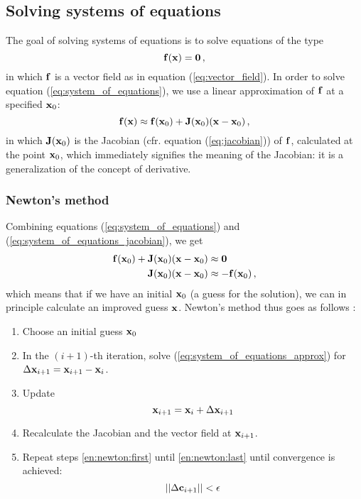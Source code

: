 \subsection{Solving systems of equations}
    The goal of solving systems of equations is to solve equations of the type
    \begin{equation} \label{eq:system_of_equations}
        \vb{f}(\vb{x}) = \vb{0} \thinspace ,
    \end{equation}
    in which $\vb{f}$ is a vector field as in equation (\ref{eq:vector_field}). In order to solve equation (\ref{eq:system_of_equations}), we use a linear approximation of $\vb{f}$ at a specified $\vb{x}_0$:
    \begin{equation} \label{eq:system_of_equations_jacobian}
        \vb{f}(\vb{x}) \approx \vb{f}(\vb{x}_0) + \vb{J}(\vb{x}_0) (\vb{x} - \vb{x}_0) \thinspace ,
    \end{equation}
    in which $\vb{J}(\vb{x}_0)$ is the Jacobian (cfr. equation (\ref{eq:jacobian})) of $\vb{f}$, calculated at the point $\vb{x}_0$, which immediately signifies the meaning of the Jacobian: it is a generalization of the concept of derivative.

\subsubsection{Newton's method}
    Combining equations (\ref{eq:system_of_equations}) and (\ref{eq:system_of_equations_jacobian}), we get
    \begin{align}
        \vb{f}(\vb{x}_0) + \vb{J}(\vb{x}_0) (\vb{x} - \vb{x}_0) &\approx \vb{0} \\
        \vb{J}(\vb{x}_0) (\vb{x} - \vb{x}_0) & \approx - \vb{f}(\vb{x}_0) \label{eq:system_of_equations_approx} \thinspace ,
    \end{align}
    which means that if we have an initial $\vb{x}_0$ (a guess for the solution), we can in principle calculate an improved guess $\vb{x}$. Newton's method thus goes as follows \cite{burden2010}:
    \begin{enumerate}
        \item Choose an initial guess $\vb{x}_0$
        \item \label{en:newton:first} In the $(i+1)$-th iteration, solve (\ref{eq:system_of_equations_approx}) for $\Delta \vb{x}_{i+1} = \vb{x}_{i+1} - \vb{x}_i$.
        \item Update
            \begin{equation}
                \vb{x}_{i+1} = \vb{x}_i + \Delta \vb{x}_{i+1}
            \end{equation}
        \item \label{en:newton:last} Recalculate the Jacobian and the vector field at $\vb{x}_{i+1}$.
        \item Repeat steps \ref{en:newton:first} until \ref{en:newton:last} until convergence is achieved:
            \begin{equation}
                || \Delta \vb{c}_{i+1} || < \epsilon
            \end{equation}
    \end{enumerate}
